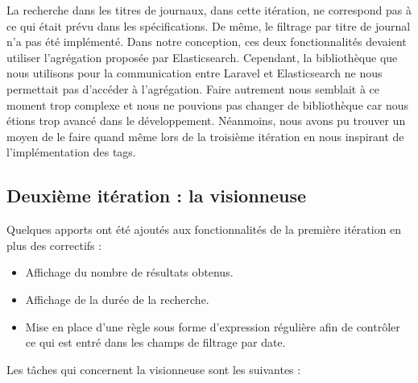 La recherche dans les titres de journaux, dans cette itération, ne correspond pas à ce qui était prévu dans les spécifications. De même, le filtrage par titre de journal n'a pas été implémenté. Dans notre conception, ces deux fonctionnalités devaient utiliser l'agrégation proposée par Elasticsearch. Cependant, la bibliothèque que nous utilisons pour la communication entre Laravel et Elasticsearch ne nous permettait pas d'accéder à l'agrégation. Faire autrement nous semblait à ce moment trop complexe et nous ne pouvions pas changer de bibliothèque car nous étions trop avancé dans le développement. Néanmoins, nous avons pu trouver un moyen de le faire quand même lors de la troisième itération en nous inspirant de l'implémentation des tags.

\subsection{Deuxième itération : la visionneuse}

Quelques apports ont été ajoutés aux fonctionnalités de la première itération en plus des correctifs :

\begin{itemize}
\setlength\itemsep{1em}
	
	\item Affichage du nombre de résultats obtenus.

	\item Affichage de la durée de la recherche.

	\item Mise en place d'une règle sous forme d'expression régulière afin de contrôler ce qui est entré dans les champs de filtrage par date.

\end{itemize}

Les tâches qui concernent la visionneuse sont les suivantes :

